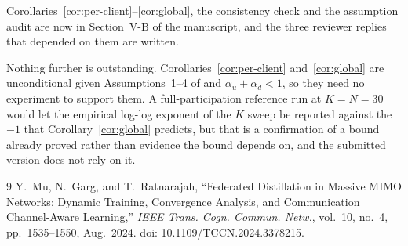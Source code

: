 \documentclass[11pt]{article}
\begin{document}
Corollaries~\ref{cor:per-client}--\ref{cor:global}, the consistency check and
the assumption audit are now in Section~V-B of the manuscript, and the three
reviewer replies that depended on them are written.

Nothing further is outstanding. Corollaries~\ref{cor:per-client}
and~\ref{cor:global} are unconditional given Assumptions~1--4 of
\cite{mu2024fedtskd} and $\alpha_u+\alpha_d<1$, so they need no experiment to
support them. A full-participation reference run at $K{=}N{=}30$ would let the
empirical log-log exponent of the $K$ sweep be reported against the $-1$ that
Corollary~\ref{cor:global} predicts, but that is a confirmation of a bound
already proved rather than evidence the bound depends on, and the submitted
version does not rely on it.

\begin{thebibliography}{9}
Y.~Mu, N.~Garg, and T.~Ratnarajah, ``Federated Distillation in Massive MIMO
Networks: Dynamic Training, Convergence Analysis, and Communication
Channel-Aware Learning,'' \emph{IEEE Trans. Cogn. Commun. Netw.}, vol.~10,
no.~4, pp.~1535--1550, Aug.~2024. doi: 10.1109/TCCN.2024.3378215.
\end{thebibliography}
\end{document}
